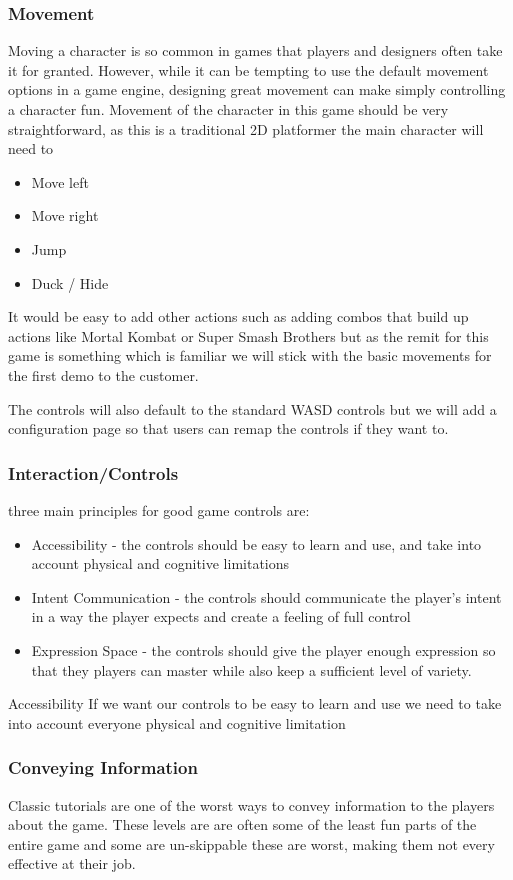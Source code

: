 \documentclass{article}
\begin{document}
\subsubsection{Movement}
Moving a character is so common in games that players and designers often take it for granted. However, while it can be tempting to use the default movement options in a game engine, designing great movement can make simply controlling a character fun. 
Movement of the character in this game should be very straightforward, as this is a traditional 2D platformer the main character will need to
\begin{itemize}
\item Move left
\item Move right
\item Jump
\item Duck / Hide
\end{itemize}

It would be easy to add other actions such as adding combos that build up actions like Mortal Kombat or Super Smash Brothers but as the remit for this game is something which is familiar we will stick with the basic movements for the first demo to the customer.

The controls will also default to the standard WASD controls but we will add a configuration page so that users can remap the controls if they want to.

\subsubsection{Interaction/Controls}
three main principles for good game controls are:
\begin{itemize}
	\item Accessibility - the controls should be easy to learn and use, and take into account physical and cognitive limitations
	\item Intent Communication - the controls should communicate the player's intent in a way the player expects and create a feeling of full control
	\item Expression Space - the controls should give the player enough expression so that they players can master while also keep a sufficient level of variety.
\end{itemize}

Accessibility 
If we want our controls to be easy to learn and use we need to take into account everyone physical and cognitive limitation 

\subsubsection{Conveying Information}
Classic tutorials are one of the worst ways to convey information to the players about the game. These levels are are often some of the least fun parts of the entire game and some are un-skippable these are worst, making them not every effective at their job.
\end{document}

